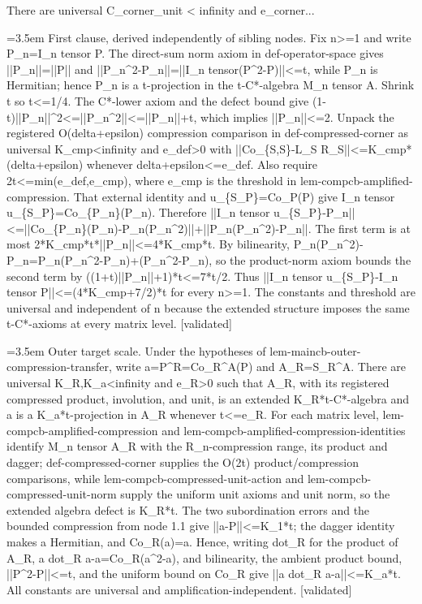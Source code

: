 \documentclass{article}
\newcommand{\step}[1]{\par\noindent\hangindent=3.5em\hangafter=1%
  \makebox[3.5em][l]{\textbf{#1.}}}
\newcommand{\steptag}[1]{\hfill{\small\textsf{[#1]}}}
\begin{document}
\begin{proofbox}{There are universal C\_corner\_unit < infinity and e\_corner...}
\step{1.3} First clause, derived independently of sibling nodes. Fix n>=1 and write P\_n=I\_n tensor P. The direct-sum norm axiom in def-operator-space gives ||P\_n||=||P|| and ||P\_n\textasciicircum{}2-P\_n||=||I\_n tensor(P\textasciicircum{}2-P)||<=t, while P\_n is Hermitian; hence P\_n is a t-projection in the t-C*-algebra M\_n tensor A. Shrink t so t<=1/4. The C*-lower axiom and the defect bound give (1-t)||P\_n||\textasciicircum{}2<=||P\_n\textasciicircum{}2||<=||P\_n||+t, which implies ||P\_n||<=2. Unpack the registered O(delta+epsilon) compression comparison in def-compressed-corner as universal K\_cmp<infinity and e\_def>0 with ||Co\_\{S,S\}-L\_S R\_S||<=K\_cmp*(delta+epsilon) whenever delta+epsilon<=e\_def. Also require 2t<=min(e\_def,e\_cmp), where e\_cmp is the threshold in lem-compcb-amplified-compression. That external identity and u\_\{S\_P\}=Co\_P(P) give I\_n tensor u\_\{S\_P\}=Co\_\{P\_n\}(P\_n). Therefore ||I\_n tensor u\_\{S\_P\}-P\_n||<=||Co\_\{P\_n\}(P\_n)-P\_n(P\_n\textasciicircum{}2)||+||P\_n(P\_n\textasciicircum{}2)-P\_n||. The first term is at most 2*K\_cmp*t*||P\_n||<=4*K\_cmp*t. By bilinearity, P\_n(P\_n\textasciicircum{}2)-P\_n=P\_n(P\_n\textasciicircum{}2-P\_n)+(P\_n\textasciicircum{}2-P\_n), so the product-norm axiom bounds the second term by ((1+t)||P\_n||+1)*t<=7*t/2. Thus ||I\_n tensor u\_\{S\_P\}-I\_n tensor P||<=(4*K\_cmp+7/2)*t for every n>=1. The constants and threshold are universal and independent of n because the extended structure imposes the same t-C*-axioms at every matrix level. \steptag{validated} \\[4pt]
\step{1.4} Outer target scale. Under the hypotheses of lem-maincb-outer-compression-transfer, write a=P\textasciicircum{}R=Co\_R\textasciicircum{}A(P) and A\_R=S\_R\textasciicircum{}A. There are universal K\_R,K\_a<infinity and e\_R>0 such that A\_R, with its registered compressed product, involution, and unit, is an extended K\_R*t-C*-algebra and a is a K\_a*t-projection in A\_R whenever t<=e\_R. For each matrix level, lem-compcb-amplified-compression and lem-compcb-amplified-compression-identities identify M\_n tensor A\_R with the R\_n-compression range, its product and dagger; def-compressed-corner supplies the O(2t) product/compression comparisons, while lem-compcb-compressed-unit-action and lem-compcb-compressed-unit-norm supply the uniform unit axioms and unit norm, so the extended algebra defect is K\_R*t. The two subordination errors and the bounded compression from node 1.1 give ||a-P||<=K\_1*t; the dagger identity makes a Hermitian, and Co\_R(a)=a. Hence, writing dot\_R for the product of A\_R, a dot\_R a-a=Co\_R(a\textasciicircum{}2-a), and bilinearity, the ambient product bound, ||P\textasciicircum{}2-P||<=t, and the uniform bound on Co\_R give ||a dot\_R a-a||<=K\_a*t. All constants are universal and amplification-independent. \steptag{validated} \\[6pt]

\end{proofbox}
\end{document}
